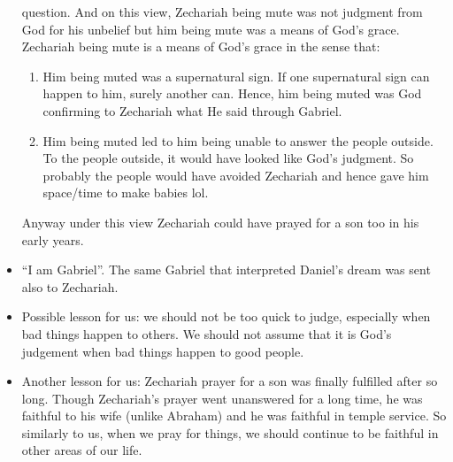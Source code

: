 \begin{itemize}
{  question.  And on this view, Zechariah being mute was not judgment from God
  for his unbelief but him being mute was a means of God's grace.  Zechariah
  being mute is a means of God's grace in the sense that:
  \begin{enumerate}
    \item{Him being muted was a supernatural sign.  If one supernatural sign
    can happen to him, surely another can.  Hence, him being muted was God
    confirming to Zechariah what He said through Gabriel.}
    \item{Him being muted led to him being unable to answer the people
    outside.  To the people outside, it would have looked like God's
    judgment.  So probably the people would have avoided Zechariah and hence
    gave him space/time to make babies lol.}
  \end{enumerate}
  Anyway under this view Zechariah could have prayed for a son too in his
  early years. }
  \item{``I am Gabriel''.  The same Gabriel that interpreted Daniel's dream
  was sent also to Zechariah.}
  \item{Possible lesson for us: we should not be too quick to judge, especially when bad things happen to others. We should not assume that it is God's judgement when bad things happen to good people.}
  \item{Another lesson for us: Zechariah prayer for a son was finally fulfilled after so long. Though Zechariah's prayer went unanswered for a long time, he was faithful to his wife (unlike Abraham) and he was faithful in temple service. So similarly to us, when we pray for things, we should continue to be faithful in other areas of our life.}
\end{itemize}